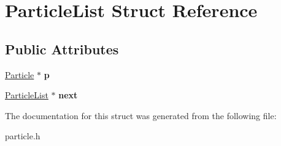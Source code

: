 \hypertarget{struct_particle_list}{\section{Particle\-List Struct Reference}
\label{struct_particle_list}
}
\subsection*{Public Attributes}
\begin{DoxyCompactItemize}
\item 
\hypertarget{struct_particle_list_a0d12b82418cac42959683a508befef74}{\hyperlink{struct_particle}{Particle} $\ast$ {\bfseries p}}\label{struct_particle_list_a0d12b82418cac42959683a508befef74}

\item 
\hypertarget{struct_particle_list_a8b51a2be156cbe64cb01af9f1f06834d}{\hyperlink{struct_particle_list}{Particle\-List} $\ast$ {\bfseries next}}\label{struct_particle_list_a8b51a2be156cbe64cb01af9f1f06834d}

\end{DoxyCompactItemize}


The documentation for this struct was generated from the following file\-:\begin{DoxyCompactItemize}
\item 
particle.\-h\end{DoxyCompactItemize}
